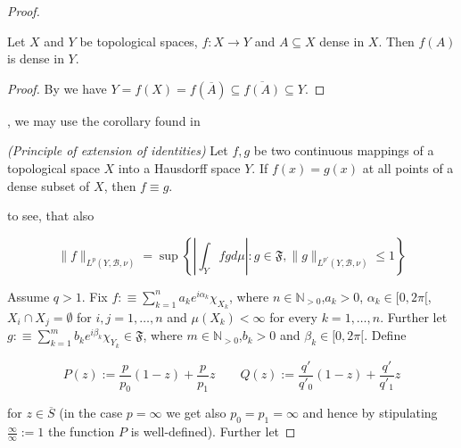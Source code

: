 \begin{proof}
{		\begin{lemma}
			Let $X$ and $Y$ be topological spaces, $f: X \rightarrow Y$ and $A \subseteq X$ dense in $X$. Then $f(A)$ is dense in $Y$. 
		\end{lemma}

		\begin{proof}
			By \cite[104]{munkres:topology:2000} we have $Y = f(X) = f(\overline{A})  \subseteq \overline{f(A)} \subseteq Y$.
		\end{proof}
		
		
	}, we may use the corollary found in \cite[76]{bourbaki:general_topology:1995}
	
	\vspace{2mm}
	
	\begin{mdframed}
		\begin{corollary}\emph{(Principle of extension of identities)}
			Let $f,g$ be two continuous mappings of a topological space $X$ into a Hausdorff space $Y$. If $f(x) = g(x)$ at all points of a dense subset of $X$, then $f \equiv g$.
		\end{corollary}
	\end{mdframed}
	
	\vspace{2mm}

	to see, that also

	\begin{equation*}
		\|f\|_{L^p(Y,\mathcal{B},\nu)} = \sup \left\{ \left\vert \int_Y fgd\mu\right\vert : g \in \mathfrak{F},\|g\|_{L^{p'}(Y,\mathcal{B},\nu)} \leqslant 1\right\}
	\end{equation*}

	Assume \underline{$q > 1$}. Fix $f :\equiv \sum_{k = 1}^n a_k e^{i\alpha_k}\chi_{X_k}$, where $n \in \mathbb{N}_{>0}$,$a_k > 0$, $\alpha_k \in [0,2\pi[$, $X_i \cap X_j = \emptyset$ for $i,j = 1,\hdots,n$ and $\mu(X_k) < \infty$ for every $k = 1,\hdots,n$. Further let $g :\equiv \sum_{k = 1}^m b_k e^{i\beta_k}\chi_{Y_k} \in \mathfrak{F}$, where $m \in \mathbb{N}_{>0}$,$b_k > 0$ and $\beta_k \in [0,2\pi[$. Define

				\begin{equation*}
					P(z) := \frac{p}{p_0}(1 - z) + \frac{p}{p_1}z \qquad Q(z) := \frac{q'}{q'_0}(1 - z) + \frac{q'}{q'_1}z
				\end{equation*}

				for $z \in \overline{S}$ (in the case $p = \infty$ we get also $p_0 = p_1 = \infty$ and hence by stipulating $\frac{\infty}{\infty}:= 1$ the function $P$ is well-defined). Further let
				

\end{proof}
